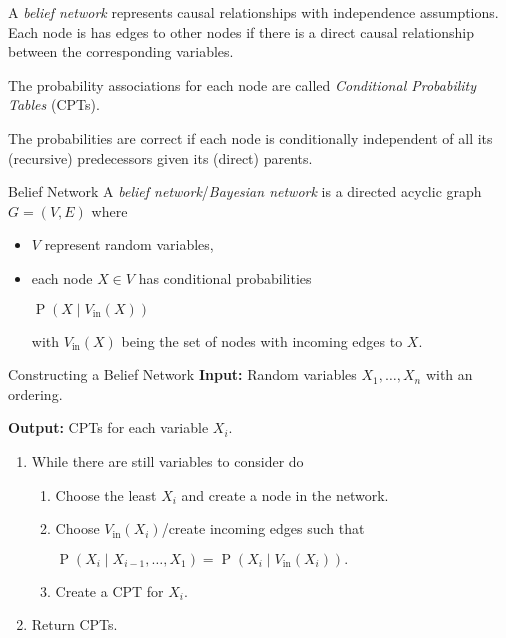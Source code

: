 \documentclass[english]{panikzettel}
\begin{document}
\begin{halfboxl}
A \emph{belief network} represents causal relationships with independence assumptions.
Each node is has edges to other nodes if there is a direct causal relationship between the corresponding variables.

The probability associations for each node are called \emph{Conditional Probability Tables} (CPTs).

The probabilities are correct if each node is conditionally independent of all its (recursive) predecessors given its (direct) parents.
\end{halfboxl}%
\begin{halfboxr}
\vspace{-\baselineskip}
\begin{defi}{Belief Network}
A \emph{belief network}/\emph{Bayesian network} is a directed acyclic graph $G = (V,E)$ where
\begin{itemize}
    \item $V$ represent random variables,
    \item each node $X \in V$ has conditional probabilities
        \begin{tightcenter}
        $\operatorname{P}(X \mid V_\mathrm{in}(X))$
        \end{tightcenter}
        with $V_\mathrm{in}(X)$ being the set of nodes with incoming edges to $X$.
\end{itemize}
\end{defi}
\end{halfboxr}

\begin{algo}{Constructing a Belief Network}
\textbf{Input:} Random variables $X_1, \ldots, X_n$ with an ordering.

\textbf{Output:} CPTs for each variable $X_i$.
\tcblower
\begin{enumerate}
    \item While there are still variables to consider do
        \begin{enumerate}
            \item Choose the least $X_i$ and create a node in the network.
            \item Choose $V_\mathrm{in}(X_i)$/create incoming edges such that
                \begin{tightcenter}
                    $\operatorname{P}(X_i \mid X_{i-1}, \ldots, X_1) = \operatorname{P}(X_i \mid V_\mathrm{in}(X_i)).$
                \end{tightcenter}
            \item Create a CPT for $X_i$.
        \end{enumerate}
    \item Return CPTs.
\end{enumerate}
\end{algo}
\end{document}
